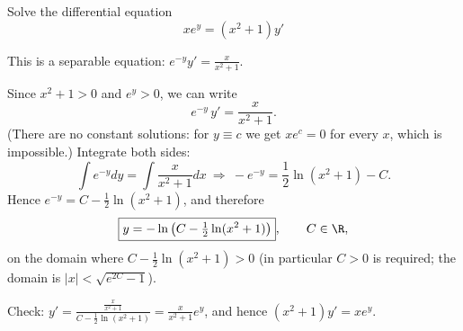 
\begin{question}
Solve the differential equation
\[ xe^y=(x^2+1)y' \]
\end{question}

\begin{hint}
This is a separable equation: $e^{-y}y'=\frac{x}{x^2+1}$.
\end{hint}

\begin{solution}
Since $x^2+1>0$ and $e^y>0$, we can write
\[ e^{-y}\,y'=\frac{x}{x^2+1}. \]
(There are no constant solutions: for $y\equiv c$ we get $xe^c=0$ for every $x$, which is impossible.) Integrate both sides:
\[ \int e^{-y}dy=\int\frac{x}{x^2+1}dx\ \Longrightarrow\ -e^{-y}=\frac12\ln(x^2+1)-C. \]
Hence $e^{-y}=C-\frac12\ln(x^2+1)$, and therefore
\[ \boxed{y=-\ln\left(C-\tfrac12\ln(x^2+1)\right)},\qquad C\in\R, \]
on the domain where $C-\frac12\ln(x^2+1)>0$ (in particular $C>0$ is required; the domain is $|x|<\sqrt{e^{2C}-1}$).

Check: $y'=\frac{\frac{x}{x^2+1}}{C-\frac12\ln(x^2+1)}=\frac{x}{x^2+1}e^{y}$, and hence $(x^2+1)y'=xe^y$.
\end{solution}
